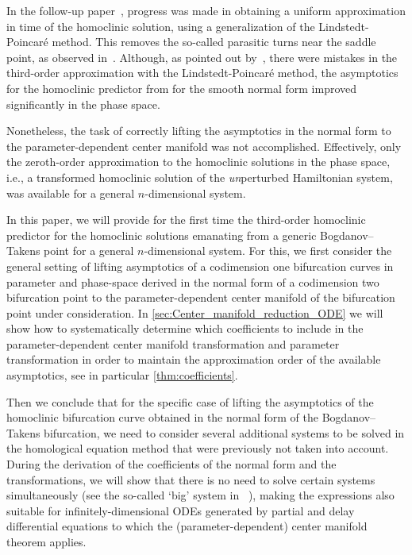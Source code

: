 In the follow-up paper~\cite{Al-Hdaibat2016}, progress was made in obtaining a
uniform approximation in time of the homoclinic solution, using a
generalization of the Lindstedt-Poincar\'e method. This removes the so-called
parasitic turns near the saddle point, as observed
in~\cite{Kuznetsov2014improved}. Although, as pointed out
by~\cite{Algaba_2019}, there were mistakes in the third-order approximation
with the Lindstedt-Poincar\'e method, the asymptotics for the homoclinic predictor from
\cite{Kuznetsov2014improved} for the smooth normal form improved significantly
in the phase space.

Nonetheless, the task of correctly lifting the asymptotics in the normal
form to the parameter-dependent center manifold was not accomplished. 
Effectively, only the zeroth-order approximation to the homoclinic
solutions in the phase space, i.e., a transformed homoclinic solution of the
\emph{un}perturbed Hamiltonian system, was available for a general $n$-dimensional
system.

In this paper, we will provide for the first time the third-order homoclinic
predictor for the homoclinic solutions emanating from a generic Bogdanov--Takens
point for a general $n$-dimensional system. For this, we first consider the general
setting of lifting asymptotics of a codimension one bifurcation curves in parameter and phase-space
derived in the normal form of a codimension two bifurcation point to the 
parameter-dependent center manifold of the bifurcation point under consideration.
In \cref{sec:Center_manifold_reduction_ODE} we will show how to systematically
determine which coefficients to include in the parameter-dependent center manifold
transformation and parameter transformation in order to maintain the approximation
order of the available asymptotics, see in particular \cref{thm:coefficients}.

Then we conclude that for the specific case of lifting the asymptotics of the
homoclinic bifurcation curve obtained in the normal form of the Bogdanov--Takens
bifurcation, we need to consider several additional systems to be solved in the
homological equation method that were previously not taken into account.
During the derivation of the coefficients of the normal form and the
transformations, we will show that there is no need to solve certain systems
simultaneously (see the so-called `big' system in
~\cite{Kuznetsov2014improved,Gray-Scott2015,Al-Hdaibat2016}), making the expressions also
suitable for infinitely-dimensional ODEs generated by partial and
delay differential equations to which the (parameter-dependent) center
manifold theorem applies. 

